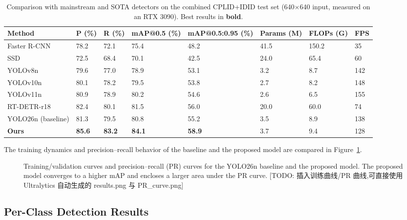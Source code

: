 \documentclass[sensors,article,submit,pdftex,moreauthors]{Definitions/mdpi}
\begin{document}
\begin{table}[H]
\caption{Comparison with mainstream and SOTA detectors on the combined CPLID+IDID test set (640$\times$640 input, measured on an RTX 3090). Best results in \textbf{bold}.}
\label{tab:compare}
\begin{tabularx}{\textwidth}{lCCCCCCC}
\toprule
\textbf{Method} & \textbf{P (\%)} & \textbf{R (\%)} & \textbf{mAP@0.5 (\%)} & \textbf{mAP@0.5:0.95 (\%)} & \textbf{Params (M)} & \textbf{FLOPs (G)} & \textbf{FPS}\\
\midrule
Faster R-CNN~\cite{ren2017faster} & 78.2 & 72.1 & 75.4 & 48.2 & 41.5 & 150.2 & 35 \\
SSD~\cite{liu2016ssd}             & 72.5 & 68.4 & 70.1 & 42.5 & 24.0 & 65.4  & 60 \\
YOLOv8n~\cite{hussain2023yolo}    & 79.6 & 77.0 & 78.9 & 53.1 & 3.2  & 8.7   & 142 \\
YOLOv10n~\cite{wang2024yolov10}   & 80.1 & 78.2 & 79.5 & 53.8 & 2.7  & 8.2   & 148 \\
YOLOv11n~\cite{khanam2024yolov11} & 80.9 & 78.9 & 80.2 & 54.6 & 2.6  & 6.5   & 155 \\
RT-DETR-r18~\cite{zhao2024rtdetr} & 82.4 & 80.1 & 81.5 & 56.0 & 20.0 & 60.0  & 74 \\
YOLO26n (baseline)                & 81.3 & 79.5 & 80.8 & 55.2 & 3.5  & 8.9   & 138 \\
\textbf{Ours}                     & \textbf{85.6} & \textbf{83.2} & \textbf{84.1} & \textbf{58.9} & 3.7 & 9.4 & 128 \\
\bottomrule
\end{tabularx}
\end{table}

The training dynamics and precision--recall behavior of the baseline and the proposed model are compared in Figure~\ref{fig:curves}.

\begin{figure}[H]
\centering
\caption{Training/validation curves and precision--recall (PR) curves for the YOLO26n baseline and the proposed model. The proposed model converges to a higher mAP and encloses a larger area under the PR curve. [TODO: 插入训练曲线/PR 曲线,可直接使用 Ultralytics 自动生成的 results.png 与 PR\_curve.png]}
\label{fig:curves}
\end{figure}

\subsection{Per-Class Detection Results}
\end{document}
